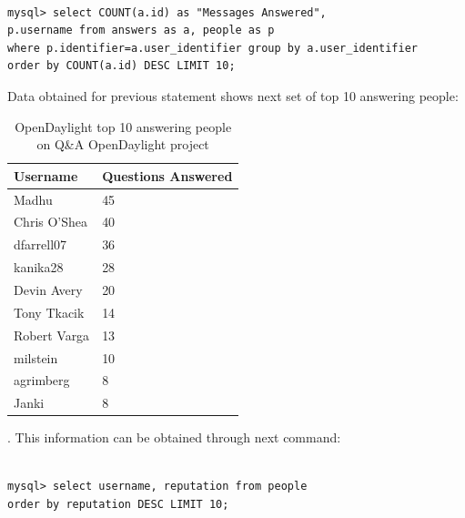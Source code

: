 \documentclass[a4paper, 12pt]{book}
\begin{document}
\begin{verbatim}

mysql> select COUNT(a.id) as "Messages Answered",
p.username from answers as a, people as p
where p.identifier=a.user_identifier group by a.user_identifier
order by COUNT(a.id) DESC LIMIT 10;

\end{verbatim}
Data obtained for previous statement shows next set of top 10 answering people:
\begin{table}[H]
\footnotesize
\begin{center}
\begin{tabular}{|p{3cm}|l|}
\hline
\textbf{Username} & \textbf{Questions Answered} \\ \hline
Madhu        & 45\\ \hline
Chris O'Shea & 40\\ \hline
dfarrell07   & 36\\ \hline
kanika28     & 28\\ \hline
Devin Avery  & 20\\ \hline
Tony Tkacik  & 14\\ \hline
Robert Varga & 13\\ \hline
milstein     & 10\\ \hline
agrimberg    & 8 \\ \hline
Janki        & 8 \\ \hline
\end{tabular}
\end{center}
\caption{OpenDaylight top 10 answering people on Q\&A OpenDaylight project}
\label{tab:odl_top_people_answering}
\end{table}

. This information can be obtained through next command:

\begin{verbatim}

mysql> select username, reputation from people
order by reputation DESC LIMIT 10;

\end{verbatim}
\end{document}
